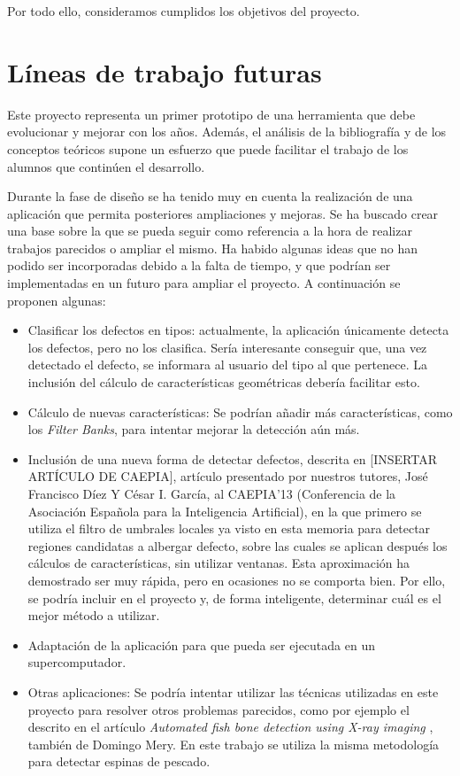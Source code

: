 Por todo ello, consideramos cumplidos los objetivos del proyecto.


\newpage
\section{Líneas de trabajo futuras}
Este proyecto representa un primer prototipo de una herramienta que debe evolucionar y mejorar con los años. Además, el análisis de la bibliografía y de los conceptos teóricos supone un esfuerzo que puede facilitar el trabajo de los alumnos que continúen el desarrollo. 

Durante la fase de diseño se ha tenido muy en cuenta la realización de una aplicación que permita posteriores ampliaciones y mejoras. Se ha buscado crear una base sobre la que se pueda seguir como referencia a la hora de realizar trabajos parecidos o ampliar el mismo. Ha habido algunas ideas que no han podido ser incorporadas debido a la falta de tiempo, y que podrían ser implementadas en un futuro para ampliar el proyecto. A continuación se proponen algunas:

\begin{itemize}
\item Clasificar los defectos en tipos: actualmente, la aplicación únicamente detecta los defectos, pero no los clasifica. Sería interesante conseguir que, una vez detectado el defecto, se informara al usuario del tipo al que pertenece. La inclusión del cálculo de características geométricas debería facilitar esto.
\item Cálculo de nuevas características: Se podrían añadir más características, como los \emph{Filter Banks}, para intentar mejorar la detección aún más.
\item Inclusión de una nueva forma de detectar defectos, descrita en [INSERTAR ARTÍCULO DE CAEPIA], artículo presentado por nuestros tutores, José Francisco Díez Y César I. García, al CAEPIA'13 (Conferencia de la Asociación Española para la Inteligencia Artificial), en la que primero se utiliza el filtro de umbrales locales ya visto en esta memoria para detectar regiones candidatas a albergar defecto, sobre las cuales se aplican después los cálculos de características, sin utilizar ventanas. Esta aproximación ha demostrado ser muy rápida, pero en ocasiones no se comporta bien. Por ello, se podría incluir en el proyecto y, de forma inteligente, determinar cuál es el mejor método a utilizar.
\item Adaptación de la aplicación para que pueda ser ejecutada en un supercomputador.
\item Otras aplicaciones: Se podría intentar utilizar las técnicas utilizadas en este proyecto para resolver otros problemas parecidos, como por ejemplo el descrito en el artículo \emph{Automated fish bone detection using X-ray imaging} \cite{mery2011automated}, también de Domingo Mery. En este trabajo se utiliza la misma metodología para detectar espinas de pescado.
\end{itemize}


